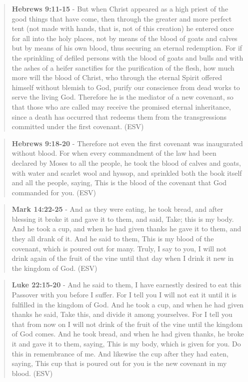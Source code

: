 \documentclass[11pt]{article}
\begin{document}
\begin{quote}
\textbf{Hebrews 9:11-15} - But when Christ appeared as a high priest of the good things that have come, then through the greater and more perfect tent (not made with hands, that is, not of this creation) he entered once for all into the holy places, not by means of the blood of goats and calves but by means of his own blood, thus securing an eternal redemption. For if the sprinkling of defiled persons with the blood of goats and bulls and with the ashes of a heifer sanctifies for the purification of the flesh, how much more will the blood of Christ, who through the eternal Spirit offered himself without blemish to God, purify our conscience from dead works to serve the living God. Therefore he is the mediator of a new covenant, so that those who are called may receive the promised eternal inheritance, since a death has occurred that redeems them from the transgressions committed under the first covenant. (ESV)
\end{quote}

\begin{quote}
\textbf{Hebrews 9:18-20} - Therefore not even the first covenant was inaugurated without blood. For when every commandment of the law had been declared by Moses to all the people, he took the blood of calves and goats, with water and scarlet wool and hyssop, and sprinkled both the book itself and all the people, saying, This is the blood of the covenant that God commanded for you. (ESV)
\end{quote}

\begin{quote}
\textbf{Mark 14:22-25} - And as they were eating, he took bread, and after blessing it broke it and gave it to them, and said, Take; this is my body. And he took a cup, and when he had given thanks he gave it to them, and they all drank of it. And he said to them, This is my blood of the covenant, which is poured out for many. Truly, I say to you, I will not drink again of the fruit of the vine until that day when I drink it new in the kingdom of God. (ESV)
\end{quote}

\begin{quote}
\textbf{Luke 22:15-20} - And he said to them, I have earnestly desired to eat this Passover with you before I suffer. For I tell you I will not eat it until it is fulfilled in the kingdom of God. And he took a cup, and when he had given thanks he said, Take this, and divide it among yourselves. For I tell you that from now on I will not drink of the fruit of the vine until the kingdom of God comes. And he took bread, and when he had given thanks, he broke it and gave it to them, saying, This is my body, which is given for you. Do this in remembrance of me. And likewise the cup after they had eaten, saying, This cup that is poured out for you is the new covenant in my blood. (ESV)
\end{quote}
\end{document}
